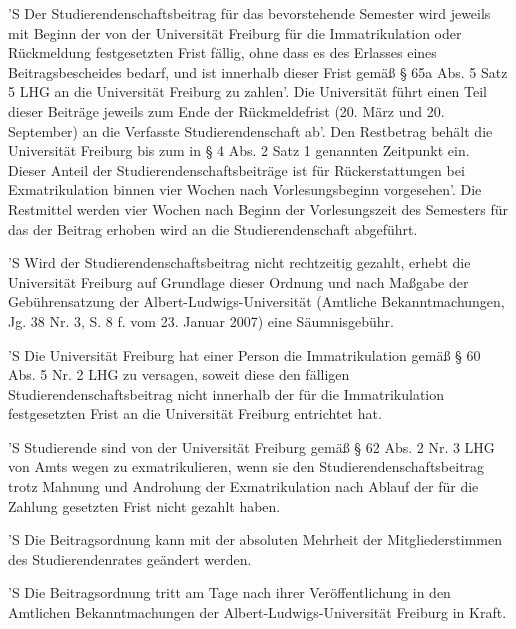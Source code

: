 \documentclass[fontsize=12pt,parskip=half]{scrartcl}
\begin{document}
\begin{contract}
  'S Der Studierendenschaftsbeitrag für das bevorstehende Semester wird jeweils
  mit Beginn der von der Universität Freiburg für die Immatrikulation oder
  Rückmeldung festgesetzten Frist fällig, ohne dass es des Erlasses eines
  Beitragsbescheides bedarf, und ist innerhalb dieser Frist gemäß § 65a Abs. 5
  Satz 5 LHG an die Universität Freiburg zu zahlen'. Die Universität führt einen
  Teil dieser Beiträge jeweils zum Ende der Rückmeldefrist (20. März und 20.
  September) an die Verfasste Studierendenschaft ab'. Den Restbetrag behält die
  Universität Freiburg bis zum in § 4 Abs. 2 Satz 1 genannten Zeitpunkt ein.
  Dieser Anteil der Studierendenschaftsbeiträge ist für Rückerstattungen bei
  Exmatrikulation binnen vier Wochen nach Vorlesungsbeginn vorgesehen'. Die
  Restmittel werden vier Wochen nach Beginn der Vorlesungszeit des Semesters für
  das der Beitrag erhoben wird an die Studierendenschaft abgeführt.

  'S Wird der Studierendenschaftsbeitrag nicht rechtzeitig gezahlt, erhebt die
  Universität Freiburg auf Grundlage dieser Ordnung und nach Maßgabe der
  Gebührensatzung der Albert-Ludwigs-Universität (Amtliche Bekanntmachungen, Jg.
  38 Nr. 3, S. 8 f. vom 23. Januar 2007) eine Säumnisgebühr.

  'S Die Universität Freiburg hat einer Person die Immatrikulation gemäß § 60
  Abs. 5 Nr. 2 LHG zu versagen, soweit diese den fälligen
  Studierendenschaftsbeitrag nicht innerhalb der für die Immatrikulation
  festgesetzten Frist an die Universität Freiburg entrichtet hat.

  'S Studierende sind von der Universität Freiburg gemäß § 62 Abs. 2 Nr. 3 LHG
  von Amts wegen zu exmatrikulieren, wenn sie den Studierendenschaftsbeitrag
  trotz Mahnung und Androhung der Exmatrikulation nach Ablauf der für die
  Zahlung gesetzten Frist nicht gezahlt haben.

  'S Die Beitragsordnung kann mit der absoluten Mehrheit der Mitgliederstimmen
  des Studierendenrates geändert werden.

  'S Die Beitragsordnung tritt am Tage nach ihrer Veröffentlichung in den
  Amtlichen Bekanntmachungen der Albert-Ludwigs-Universität Freiburg in Kraft. 
\end{contract}
\end{document}
